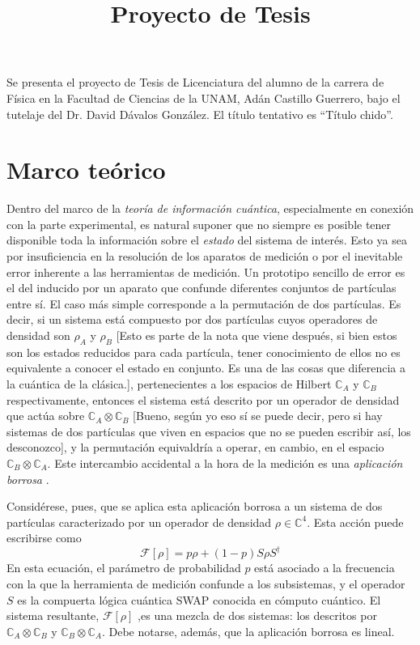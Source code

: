 \documentclass[onecolumn,11pt]{article}
\title{Proyecto de Tesis} \date{}
\newcommand{\mcF}{\mathcal{F}}
\newcommand{\Hh}{\mathbb{C}} %
\newcommand{\nota}[1]{{\color{red} [#1]}}
\newcommand{\notaAd}[1]{{\color{blue} [#1]}} %
\begin{document}
\maketitle
\thispagestyle{empty}
Se presenta el proyecto de Tesis de Licenciatura del alumno de la carrera de Física en la Facultad de Ciencias de la UNAM, Adán Castillo Guerrero, bajo el tutelaje del Dr. David Dávalos González. El título tentativo es ``Título chido''.

\section{Marco teórico}


Dentro del marco de la \textit{teoría de información cuántica}, especialmente en conexión con la parte experimental, es natural suponer que no siempre es posible tener disponible toda la información sobre el \textit{estado} del sistema de interés. Esto ya sea por insuficiencia en la resolución de los aparatos de medición o por el inevitable error inherente a las herramientas de medición. Un prototipo sencillo de error es el del inducido por un aparato que confunde diferentes conjuntos de partículas entre sí. El caso más simple corresponde a la permutación de dos partículas. Es decir, si un sistema está compuesto por dos partículas cuyos operadores de densidad son $\rho_{A}$ y $\rho_{B}$ \nota{Esto es parte de la nota que viene después, si bien estos son los estados reducidos para cada partícula, tener conocimiento de ellos no es equivalente a conocer el estado en conjunto. Es una de las cosas que diferencia a la cuántica de la clásica.}, pertenecientes a los espacios de Hilbert $\Hh_{A}$ y $\Hh_{B}$ respectivamente, entonces el sistema está descrito por un operador de densidad que actúa sobre $\Hh_{A}\otimes\Hh_{B}$ \notaAd{Bueno, según yo eso sí se puede decir, pero si hay sistemas de dos partículas que viven en espacios que no se pueden escribir así, los desconozco}, y la permutación equivaldría a operar, en cambio, en el espacio $\Hh_{B}\otimes\Hh_{A}$. Este intercambio accidental a la hora de la medición es una \textit{aplicación borrosa} \cite{FuzzyMeasurements}.

Considérese, pues, que se aplica esta aplicación borrosa a un sistema de dos partículas caracterizado por un operador de densidad $\rho\in\Hh^{4}$. Esta acción puede escribirse como
\begin{equation}\label{eq:Fuzzy2}
\mcF[\rho]=p\rho+(1-p)S\rho S^{\dag}
\end{equation}
En esta ecuación, el parámetro  de probabilidad $p$ está asociado a la frecuencia con la que la herramienta de medición confunde a los subsistemas, y el operador $S$ es la compuerta lógica cuántica SWAP conocida en cómputo cuántico. El sistema resultante, $\mcF[\rho]$ ,es una mezcla de dos sistemas: los descritos por $\Hh_{A}\otimes\Hh_{B}$ y $\Hh_{B}\otimes\Hh_{A}$. Debe notarse, además, que la aplicación borrosa es lineal.
\end{document}
